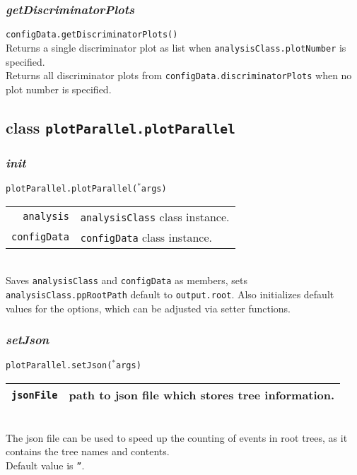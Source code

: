 \documentclass[12pt, a4paper]{article}
\newcommand{\args}{$^*$args}
\begin{document}
\subsubsection{\textit{getDiscriminatorPlots}}
\texttt{configData.getDiscriminatorPlots()}\\
Returns a single discriminator plot as list when \texttt{analysisClass.plotNumber} is specified.\\
Returns all discriminator plots from \texttt{configData.discriminatorPlots} when no plot number is specified.


\subsection{class \texttt{plotParallel.plotParallel}}


\subsubsection{\textit{init}}
\texttt{plotParallel.plotParallel(\args)}\\
\begin{tabular}{r|l}
\hline
\texttt{analysis}		& \texttt{analysisClass} class instance. \\
\texttt{configData}		& \texttt{configData} class instance.\\
\hline
\end{tabular}\\
Saves \texttt{analysisClass} and \texttt{configData} as members, sets \texttt{analysisClass.ppRootPath} default to \texttt{output.root}. Also initializes default values for the options, which can be adjusted via setter functions.


\subsubsection{\textit{setJson}}
\texttt{plotParallel.setJson(\args)}\\
\begin{tabular}{r|l}
\hline
\texttt{jsonFile}	& path to json file which stores tree information.\\
\hline
\end{tabular}
\\
The json file can be used to speed up the counting of events in root trees, as it contains the tree names and contents.\\
Default value is \texttt{''}.
\end{document}
